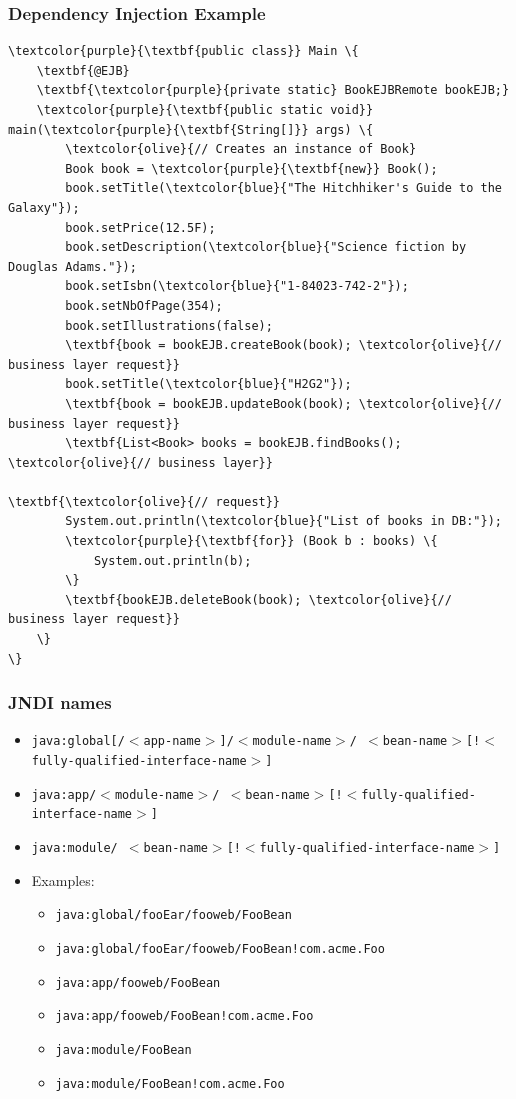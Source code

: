 \documentclass[10pt,xcolor=pdflatex]{beamer}
\begin{document}
\begin{frame}[fragile]\frametitle{Dependency Injection Example}
\begin{Verbatim}[fontsize=\footnotesize, commandchars=\\\{\}]
\textcolor{purple}{\textbf{public class}} Main \{
    \textbf{@EJB}
    \textbf{\textcolor{purple}{private static} BookEJBRemote bookEJB;}
    \textcolor{purple}{\textbf{public static void}} main(\textcolor{purple}{\textbf{String[]}} args) \{
        \textcolor{olive}{// Creates an instance of Book}
        Book book = \textcolor{purple}{\textbf{new}} Book();
        book.setTitle(\textcolor{blue}{"The Hitchhiker's Guide to the Galaxy"});
        book.setPrice(12.5F);
        book.setDescription(\textcolor{blue}{"Science fiction by Douglas Adams."});
        book.setIsbn(\textcolor{blue}{"1-84023-742-2"});
        book.setNbOfPage(354);
        book.setIllustrations(false);
        \textbf{book = bookEJB.createBook(book); \textcolor{olive}{// business layer request}}
        book.setTitle(\textcolor{blue}{"H2G2"});
        \textbf{book = bookEJB.updateBook(book); \textcolor{olive}{// business layer request}}
        \textbf{List<Book> books = bookEJB.findBooks(); \textcolor{olive}{// business layer}}
                                                \textbf{\textcolor{olive}{// request}}
        System.out.println(\textcolor{blue}{"List of books in DB:"});
        \textcolor{purple}{\textbf{for}} (Book b : books) \{
            System.out.println(b);
        \}
        \textbf{bookEJB.deleteBook(book); \textcolor{olive}{// business layer request}}
    \}
\}
\end{Verbatim}
\end{frame}


\begin{frame}\frametitle{JNDI names}
	\begin{itemize}
		\item \texttt{java:global[/$<$app-name$>$]/$<$module-name$>$/
        $<$bean-name$>$[!$<$fully-qualified-interface-name$>$]}
		\item \texttt{java:app/$<$module-name$>$/
        $<$bean-name$>$[!$<$fully-qualified-interface-name$>$]}
		\item \texttt{java:module/
        $<$bean-name$>$[!$<$fully-qualified-interface-name$>$]}
		\medskip
        \item Examples:
          \begin{itemize}
            \item \texttt{java:global/fooEar/fooweb/FooBean}
		    \item \texttt{java:global/fooEar/fooweb/FooBean!com.acme.Foo}
		    \item \texttt{java:app/fooweb/FooBean}
		    \item \texttt{java:app/fooweb/FooBean!com.acme.Foo}
		    \item \texttt{java:module/FooBean}
		    \item \texttt{java:module/FooBean!com.acme.Foo}
          \end{itemize}
	\end{itemize}
\end{frame}
\end{document}
